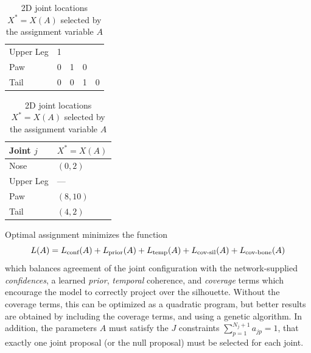 \begin{table}
{{\begin{tabular}{@{}lllll@{}}
            Upper Leg & 1 & \cellcolor[HTML]{808080} & \cellcolor[HTML]{808080} & \cellcolor[HTML]{808080} \\
            Paw       & 0 & 1                        & 0                        & \cellcolor[HTML]{808080} \\
            Tail      & 0 & 0                        & 1                        & 0                        \\
            \bottomrule
            \end{tabular}
            \caption{Assignment variables $A = \bvec a_j = \{a_{jp}\} \in \{0, 1\}^{N_j+1}$ for the current frame stored as a jagged array.}
            \label{tab:oja-proposals}
        }
        \bigskip
        \parbox{\linewidth}{
            \strut
            \centering
            \begin{tabular}{@{}ll@{}}
                \toprule
                Joint $j$ & $X^* = X(A)$ \\
                \midrule
                Nose      & $(0, 2)$     \\
                Upper Leg & ---          \\
                Paw       & $(8, 10)$    \\
                Tail      & $(4, 2)$     \\
                \bottomrule
            \end{tabular}
            \caption{2D joint locations $X^* = X(A)$ selected by the assignment variable $A$}
            \label{tab:oja-selected}
        }
    }
\end{table}        
        

Optimal assignment minimizes the function
\begin{equation}
L(A) = L_{\textrm{conf}}(A) + L_{\textrm{prior}}(A) + L_{\textrm{temp}}(A) + L_{\textrm{cov-sil}}(A) + L_{\textrm{cov-bone}}(A)
\end{equation}
which balances agreement of the joint configuration with the network-supplied {\em confidences}, a learned {\em prior}, {\em temporal} coherence, and {\em coverage} terms which encourage the model to correctly project over the silhouette. Without the coverage terms, this can be optimized as a quadratic program, but better results are obtained by including the coverage terms, and using a genetic algorithm. In addition, the parameters $A$ must satisfy the $J$ constraints $\sum_{p=1}^{N_j+1} a_{jp} = 1$, that exactly one joint proposal (or the null proposal) must be selected for each joint.

